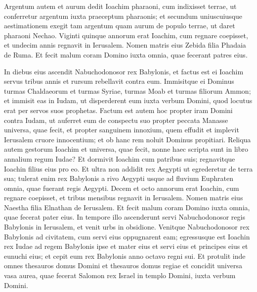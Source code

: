 \begin{biblechapter}
\begin{biblechapter}
\begin{biblechapter}
\begin{biblechapter}
\begin{biblechapter}
\begin{biblechapter}
\begin{biblechapter}
\begin{biblechapter}
\begin{biblechapter}
\begin{biblechapter}
\begin{biblechapter}
\begin{biblechapter}
\begin{biblechapter}
\begin{biblechapter}
\begin{biblechapter}
\begin{biblechapter}
\begin{biblechapter}
\begin{biblechapter}
\begin{biblechapter}
\begin{biblechapter}
\begin{biblechapter}
\begin{biblechapter}
\begin{biblechapter}
\verse Argentum autem et aurum dedit Ioachim pharaoni, cum indixisset terrae, ut conferretur argentum iuxta praeceptum pharaonis; et secundum uniuscuiusque aestimationem exegit tam argentum quam aurum de populo terrae, ut daret pharaoni Nechao.
 \verse Viginti quinque annorum erat Ioachim, cum regnare coepisset, et undecim annis regnavit in Ierusalem. Nomen matris eius Zebida filia Phadaia de Ruma. 
\verse Et fecit malum coram Domino iuxta omnia, quae fecerant patres eius.
 
\begin{biblechapter}
 \verse In diebus eius ascendit Nabuchodonosor rex Babylonis, et factus est ei Ioachim servus tribus annis et rursum rebellavit contra eum. 
\verse Immisitque ei Dominus turmas Chaldaeorum et turmas Syriae, turmas Moab et turmas filiorum Ammon; et immisit eas in Iudam, ut disperderent eum iuxta verbum Domini, quod locutus erat per servos suos prophetas. 
\verse Factum est autem hoc propter iram Domini contra Iudam, ut auferret eum de conspectu suo propter peccata Manasse universa, quae fecit, 
\verse et propter sanguinem innoxium, quem effudit et implevit Ierusalem cruore innocentium; et ob hanc rem noluit Dominus propitiari.
 \verse Reliqua autem gestorum Ioachim et universa, quae fecit, nonne haec scripta sunt in libro annalium regum Iudae? Et dormivit Ioachim cum patribus suis; 
\verse regnavitque Ioachin filius eius pro eo.
 \verse Et ultra non addidit rex Aegypti ut egrederetur de terra sua; tulerat enim rex Babylonis a rivo Aegypti usque ad fluvium Euphraten omnia, quae fuerant regis Aegypti.
 \verse Decem et octo annorum erat Ioachin, cum regnare coepisset, et tribus mensibus regnavit in Ierusalem. Nomen matris eius Naestha filia Elnathan de Ierusalem. 
 \verse Et fecit malum coram Domino iuxta omnia, quae fecerat pater eius.
 \verse In tempore illo ascenderunt servi Nabuchodonosor regis Babylonis in Ierusalem, et venit urbs in obsidione. 
\verse Venitque Nabuchodonosor rex Babylonis ad civitatem, cum servi eius oppugnarent eam; 
\verse egressusque est Ioachin rex Iudae ad regem Babylonis ipse et mater eius et servi eius et principes eius et eunuchi eius; et cepit eum rex Babylonis anno octavo regni sui.
 \verse Et protulit inde omnes thesauros domus Domini et thesauros domus regiae et concidit universa vasa aurea, quae fecerat Salomon rex Israel in templo Domini, iuxta verbum Domini. 

\end{biblechapter}
\end{biblechapter}
\end{biblechapter}
\end{biblechapter}
\end{biblechapter}
\end{biblechapter}
\end{biblechapter}
\end{biblechapter}
\end{biblechapter}
\end{biblechapter}
\end{biblechapter}
\end{biblechapter}
\end{biblechapter}
\end{biblechapter}
\end{biblechapter}
\end{biblechapter}
\end{biblechapter}
\end{biblechapter}
\end{biblechapter}
\end{biblechapter}
\end{biblechapter}
\end{biblechapter}
\end{biblechapter}
\end{biblechapter}
